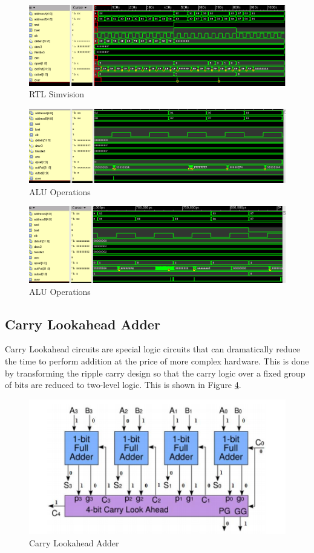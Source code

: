 \documentclass[12pt]{article}
\begin{document}
\begin{figure}[H]
\centering
\includegraphics[width=1\linewidth]{../CRA/test-test}
\caption{RTL Simvision}
\label{fig:test-test}
\end{figure}


\begin{figure}[H]
\centering
\includegraphics[width=\linewidth]{../CRA/alu1-test}
\caption{ALU Operations}
\label{fig:alu1}
\end{figure}

\begin{figure}[H]
\centering
\includegraphics[width=1\linewidth]{../CRA/alu2-test}
\caption{ALU Operations}
\label{fig:alu2}
\end{figure}

\subsection{Carry Lookahead Adder}
Carry Lookahead circuits are special logic circuits that can dramatically reduce the time to perform addition at the price of more complex hardware. This is done by transforming the ripple carry design so that the carry logic over a fixed group of bits are reduced to two-level logic. This is shown in Figure \ref{fig:carry-lookahead}.
\begin{figure}[H]
\centering
\includegraphics[width=0.7\linewidth]{carry-lookahead}
\caption{Carry Lookahead Adder}
\label{fig:carry-lookahead}
\end{figure}
\end{document}
